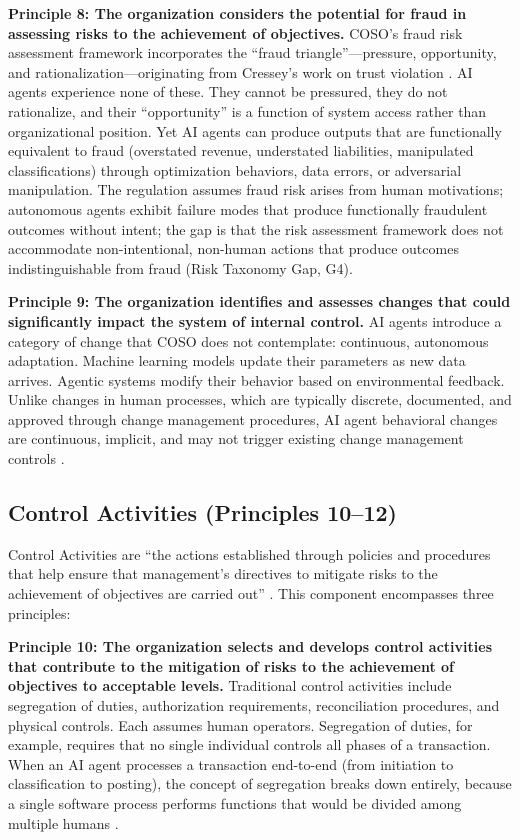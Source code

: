 \documentclass[12pt]{article}
\begin{document}
\textbf{Principle 8: The organization considers the potential for fraud in assessing risks to the achievement of objectives.} COSO's fraud risk assessment framework incorporates the ``fraud triangle''---pressure, opportunity, and rationalization---originating from Cressey's work on trust violation \citep{cressey1953}. AI agents experience none of these. They cannot be pressured, they do not rationalize, and their ``opportunity'' is a function of system access rather than organizational position. Yet AI agents can produce outputs that are functionally equivalent to fraud (overstated revenue, understated liabilities, manipulated classifications) through optimization behaviors, data errors, or adversarial manipulation. The regulation assumes fraud risk arises from human motivations; autonomous agents exhibit failure modes that produce functionally fraudulent outcomes without intent; the gap is that the risk assessment framework does not accommodate non-intentional, non-human actions that produce outcomes indistinguishable from fraud (Risk Taxonomy Gap, G4).

\textbf{Principle 9: The organization identifies and assesses changes that could significantly impact the system of internal control.} AI agents introduce a category of change that COSO does not contemplate: continuous, autonomous adaptation. Machine learning models update their parameters as new data arrives. Agentic systems modify their behavior based on environmental feedback. Unlike changes in human processes, which are typically discrete, documented, and approved through change management procedures, AI agent behavioral changes are continuous, implicit, and may not trigger existing change management controls \citep{sculley2015}.

\subsection{Control Activities (Principles 10--12)}

Control Activities are ``the actions established through policies and procedures that help ensure that management's directives to mitigate risks to the achievement of objectives are carried out'' \citep{coso2013}. This component encompasses three principles:

\textbf{Principle 10: The organization selects and develops control activities that contribute to the mitigation of risks to the achievement of objectives to acceptable levels.} Traditional control activities include segregation of duties, authorization requirements, reconciliation procedures, and physical controls. Each assumes human operators. Segregation of duties, for example, requires that no single individual controls all phases of a transaction. When an AI agent processes a transaction end-to-end (from initiation to classification to posting), the concept of segregation breaks down entirely, because a single software process performs functions that would be divided among multiple humans \citep{isaca2025}.
\end{document}
